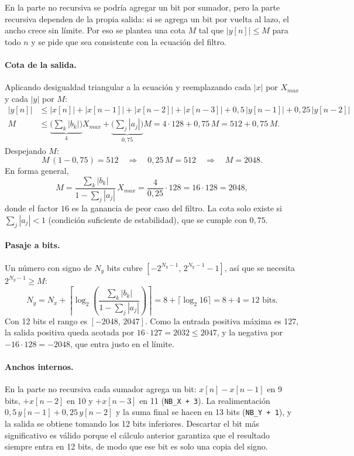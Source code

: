 \documentclass[11pt,a4paper]{scrartcl}
\newcommand{\sig}[1]{\texttt{#1}}
\begin{document}
	En la parte no recursiva se podría agregar un bit por sumador, pero la parte recursiva dependen de la propia salida: si se agrega un bit por vuelta al lazo, el ancho crece sin límite. Por eso se plantea una
	cota $M$ tal que $|y[n]| \le M$ para todo $n$ y se pide que sea consistente con la
	ecuación del filtro.

	\paragraph{Cota de la salida.} Aplicando desigualdad triangular a la ecuación y
	reemplazando cada $|x|$ por $X_{max}$ y cada $|y|$ por $M$:
	\begin{align*}
		|y[n]| &\le |x[n]| + |x[n-1]| + |x[n-2]| + |x[n-3]| + 0{,}5\,|y[n-1]| + 0{,}25\,|y[n-2]| \\
		M &\le \underbrace{\Big(\sum_k |b_k|\Big)}_{4} X_{max} + \underbrace{\Big(\sum_j |a_j|\Big)}_{0{,}75} M
		= 4 \cdot 128 + 0{,}75\,M = 512 + 0{,}75\,M .
	\end{align*}
	Despejando $M$:
	\[
		M\,(1 - 0{,}75) = 512 \quad\Rightarrow\quad 0{,}25\,M = 512 \quad\Rightarrow\quad
		M = 2048 .
	\]
	En forma general,
	\[
		M = \frac{\sum_k |b_k|}{1 - \sum_j |a_j|}\, X_{max} = \frac{4}{0{,}25}\cdot 128 = 16 \cdot 128 = 2048,
	\]
	donde el factor $16$ es la ganancia de peor caso del filtro. La cota solo existe si
	$\sum_j |a_j| < 1$ (condición suficiente de estabilidad), que se cumple con
	$0{,}75$.

	\paragraph{Pasaje a bits.} Un número con signo de $N_y$ bits cubre
	$[-2^{N_y-1},\, 2^{N_y-1}-1]$, así que se necesita $2^{N_y-1} \ge M$:
	\[
		N_y = N_x + \left\lceil \log_2\!\left(\frac{\sum_k |b_k|}{1 - \sum_j |a_j|}\right) \right\rceil
		= 8 + \lceil \log_2 16 \rceil = 8 + 4 = \boxed{12 \text{ bits}} .
	\]
	Con 12 bits el rango es $[-2048,\, 2047]$. Como la entrada positiva máxima es 127, la
	salida positiva queda acotada por $16 \cdot 127 = 2032 \le 2047$, y la negativa por
	$-16 \cdot 128 = -2048$, que entra justo en el límite.

	\paragraph{Anchos internos.} En la parte no recursiva cada sumador agrega un bit:
	$x[n]-x[n-1]$ en 9 bits, $+x[n-2]$ en 10 y $+x[n-3]$ en 11 (\sig{NB\_X + 3}). La
	realimentación $0{,}5\,y[n-1] + 0{,}25\,y[n-2]$ y la suma final se hacen en 13 bits
	(\sig{NB\_Y + 1}), y la salida se obtiene tomando los 12 bits inferiores. Descartar el
	bit más significativo es válido porque el cálculo anterior garantiza que el resultado
	siempre entra en 12 bits, de modo que ese bit es solo una copia del signo.
\end{document}
